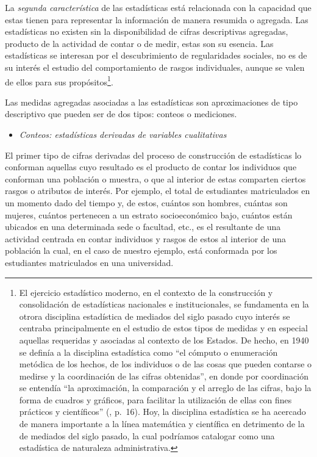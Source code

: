 \documentclass[
]{book}
\providecommand{\tightlist}{%
  \setlength{\itemsep}{0pt}\setlength{\parskip}{0pt}}
\begin{document}
La \emph{segunda característica} de las estadísticas está relacionada con la capacidad que estas tienen para representar la información de manera resumida o agregada. Las estadísticas no existen sin la disponibilidad de cifras descriptivas agregadas, producto de la actividad de contar o de medir, estas son su esencia. Las estadísticas se interesan por el descubrimiento de regularidades sociales, no es de su interés el estudio del comportamiento de rasgos individuales, aunque se valen de ellos para sus propósitos\footnote{El ejercicio estadístico moderno, en el contexto de la construcción y consolidación de estadísticas nacionales e institucionales, se fundamenta en la otrora disciplina estadística de mediados del siglo pasado cuyo interés se centraba principalmente en el estudio de estos tipos de medidas y en especial aquellas requeridas y asociadas al contexto de los Estados. De hecho, en 1940 se definía a la disciplina estadística como ``el cómputo o enumeración metódica de los hechos, de los individuos o de las cosas que pueden contarse o medirse y la coordinación de las cifras obtenidas'', en donde por coordinación se entendía ``la aproximación, la comparación y el arreglo de las cifras, bajo la forma de cuadros y gráficos, para facilitar la utilización de ellas con fines prácticos y científicos'' (\citet{rodriguez}, p.~16). Hoy, la disciplina estadística se ha acercado de manera importante a la línea matemática y científica en detrimento de la de mediados del siglo pasado, la cual podríamos catalogar como una estadística de naturaleza administrativa.}.

Las medidas agregadas asociadas a las estadísticas son aproximaciones de tipo descriptivo que pueden ser de dos tipos: conteos o mediciones.

\begin{itemize}
\tightlist
\item
  \emph{Conteos: estadísticas derivadas de variables cualitativas}
\end{itemize}

El primer tipo de cifras derivadas del proceso de construcción de estadísticas lo conforman aquellas cuyo resultado es el producto de contar los individuos que conforman una población o muestra, o que al interior de estas comparten ciertos rasgos o atributos de interés. Por ejemplo, el total de estudiantes matriculados en un momento dado del tiempo y, de estos, cuántos son hombres, cuántas son mujeres, cuántos pertenecen a un estrato socioeconómico bajo, cuántos están ubicados en una determinada sede o facultad, etc., es el resultante de una actividad centrada en contar individuos y rasgos de estos al interior de una población la cual, en el caso de nuestro ejemplo, está conformada por los estudiantes matriculados en una universidad.
\end{document}
